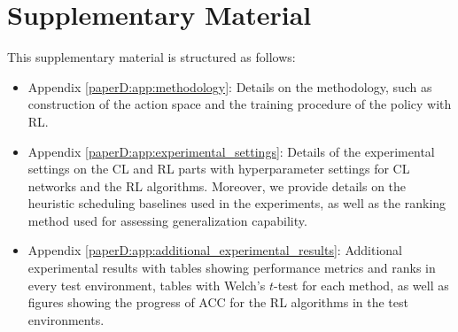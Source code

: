 
\section*{Supplementary Material}

This supplementary material is structured as follows:
\begin{itemize}
    \item Appendix \ref{paperD:app:methodology}: Details on the methodology, such as construction of the action space and the training procedure of the policy with RL.
    
    \item Appendix \ref{paperD:app:experimental_settings}: Details of the experimental settings on the CL and RL parts with hyperparameter settings for CL networks and the RL algorithms.  Moreover, we provide details on the heuristic scheduling baselines used in the experiments, as well as the ranking method used for assessing generalization capability. 
    
    \item Appendix \ref{paperD:app:additional_experimental_results}: Additional experimental results with tables showing performance metrics and ranks in every test environment, tables with Welch's $t$-test for each method, as well as figures showing the progress of ACC for the RL algorithms in the test environments.  
\end{itemize}




\clearpage




